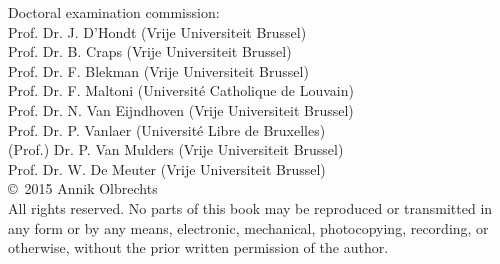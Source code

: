 

\newpage
\thispagestyle{empty}




\begin{large}

\begin{center}
\begin{minipage}{15cm}
Doctoral examination commission:\\[2mm]
Prof. Dr. J. D'Hondt (Vrije Universiteit Brussel)\\%
Prof. Dr. B. Craps (Vrije Universiteit Brussel)\\%
Prof. Dr. F. Blekman (Vrije Universiteit Brussel)\\%
Prof. Dr. F. Maltoni (Université Catholique de Louvain)\\%
Prof. Dr. N. Van Eijndhoven (Vrije Universiteit Brussel)\\%
Prof. Dr. P. Vanlaer (Université Libre de Bruxelles) \\%
(Prof.) Dr. P. Van Mulders (Vrije Universiteit Brussel)\\
Prof. Dr. W. De Meuter (Vrije Universiteit Brussel)\\[1cm]


\copyright \, 2015 Annik Olbrechts\\[0.5cm]
All rights reserved. No parts of this book may be reproduced or transmitted in any form or by
any means, electronic, mechanical, photocopying, recording, or otherwise, without the prior
written permission of the author.


\end{minipage}
\end{center}
\end{large}
